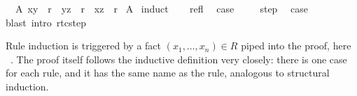\begin{isabellebody}
\isamarkuptrue%
\isamarkupfalse%
\ \ A{\isacharcolon}\ {\isachardoublequoteopen}{\isacharparenleft}x{\isacharcomma}y{\isacharparenright}\ {\isasymin}\ r{\isacharasterisk}{\isachardoublequoteclose}\ \ {\isachardoublequoteopen}{\isacharparenleft}y{\isacharcomma}z{\isacharparenright}\ {\isasymin}\ r{\isacharasterisk}\ {\isasymLongrightarrow}\ {\isacharparenleft}x{\isacharcomma}z{\isacharparenright}\ {\isasymin}\ r{\isacharasterisk}{\isachardoublequoteclose}\isanewline
%
\isadelimproof
%
\endisadelimproof
%
\isatagproof
{}\isamarkupfalse%
\ A\isanewline
{}\isamarkupfalse%
\ induct\isanewline
\ \ \isamarkupfalse%
\ refl\ \isamarkupfalse%
\ {\isacharquery}case\ \isacommand{{\isachardot}}\isamarkupfalse%
\isanewline
{}\isamarkupfalse%
\isanewline
\ \ \isamarkupfalse%
\ step\ \isamarkupfalse%
\ {\isacharquery}case\ \isamarkupfalse%
{\isacharparenleft}blast\ intro{\isacharcolon}\ rtc{\isachardot}step{\isacharparenright}\isanewline
{}\isamarkupfalse%
%
\endisatagproof
{\isafoldproof}%
%
\isadelimproof
%
\endisadelimproof
%
\begin{isamarkuptext}%
\noindent Rule induction is triggered by a fact $(x_1,\dots,x_n)
\in R$ piped into the proof, here ~. The
proof itself follows the inductive definition very
closely: there is one case for each rule, and it has the same name as
the rule, analogous to structural induction.


\end{isamarkuptext}
\end{isabellebody}
